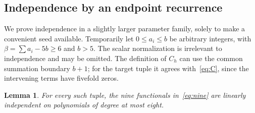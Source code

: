 \documentclass[11pt]{article}
\newtheorem{lemma}[theorem]{Lemma}
\theoremstyle{definition}\newtheorem{definition}[theorem]{Definition}
\theoremstyle{remark}\newtheorem{remark}[theorem]{Remark}
\begin{document}
\subsection{Independence by an endpoint recurrence}
We prove independence in a slightly larger parameter family, solely to
make a convenient seed available.  Temporarily let $0\le a_i\le b$ be
arbitrary integers, with $\beta=\sum a_i-5b\ge6$ and $b>5$.
The scalar normalization is irrelevant to independence and may be omitted.
The definition of $C_h$ can use the common summation boundary $b+1$;
for the target tuple it agrees with~\eqref{eq:C}, since the intervening
terms have fivefold zeros.

\begin{lemma}\label{lem:independent}
For every such tuple, the nine functionals in~\eqref{eq:nine} are
linearly independent on polynomials of degree at most eight.
\end{lemma}
\end{document}
